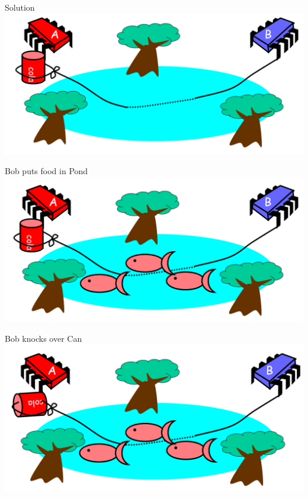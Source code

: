 \begin{frame}{Solution}
  \includegraphics[width=\textwidth]{figures/pets-4}
\end{frame}

\begin{frame}{Bob puts food in Pond}
  \includegraphics[width=\textwidth]{figures/pets-5}
\end{frame}

\begin{frame}{Bob knocks over Can}
  \includegraphics[width=\textwidth]{figures/pets-6}
\end{frame}


